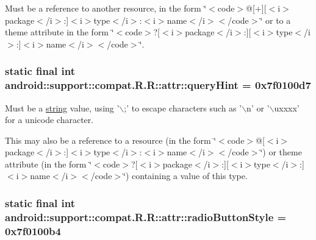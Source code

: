 Must be a reference to another resource, in the form \char`\"{}$<$code$>$@\mbox{[}+\mbox{]}\mbox{[}$<$i$>$package$<$/i$>$:\mbox{]}$<$i$>$type$<$/i$>$:$<$i$>$name$<$/i$>$$<$/code$>$\char`\"{} or to a theme attribute in the form \char`\"{}$<$code$>$?\mbox{[}$<$i$>$package$<$/i$>$:\mbox{]}\mbox{[}$<$i$>$type$<$/i$>$:\mbox{]}$<$i$>$name$<$/i$>$$<$/code$>$\char`\"{}. \hypertarget{classandroid_1_1support_1_1compat_1_1_r_1_1attr_49d33285bc03ffcc4045f8fd7b2b7822}{
\subsubsection[{queryHint}]{\setlength{\rightskip}{0pt plus 5cm}static final int android::support::compat.R.R::attr::queryHint = 0x7f0100d7}}
\label{classandroid_1_1support_1_1compat_1_1_r_1_1attr_49d33285bc03ffcc4045f8fd7b2b7822}


Must be a \hyperlink{classandroid_1_1support_1_1compat_1_1_r_1_1string}{string} value, using '$\backslash$;' to escape characters such as '$\backslash$n' or '$\backslash$uxxxx' for a unicode character. 

This may also be a reference to a resource (in the form \char`\"{}$<$code$>$@\mbox{[}$<$i$>$package$<$/i$>$:\mbox{]}$<$i$>$type$<$/i$>$:$<$i$>$name$<$/i$>$$<$/code$>$\char`\"{}) or theme attribute (in the form \char`\"{}$<$code$>$?\mbox{[}$<$i$>$package$<$/i$>$:\mbox{]}\mbox{[}$<$i$>$type$<$/i$>$:\mbox{]}$<$i$>$name$<$/i$>$$<$/code$>$\char`\"{}) containing a value of this type. \hypertarget{classandroid_1_1support_1_1compat_1_1_r_1_1attr_8b6391b5b87f87f74af7576b50386688}{
\subsubsection[{radioButtonStyle}]{\setlength{\rightskip}{0pt plus 5cm}static final int android::support::compat.R.R::attr::radioButtonStyle = 0x7f0100b4}}
\label{classandroid_1_1support_1_1compat_1_1_r_1_1attr_8b6391b5b87f87f74af7576b50386688}


